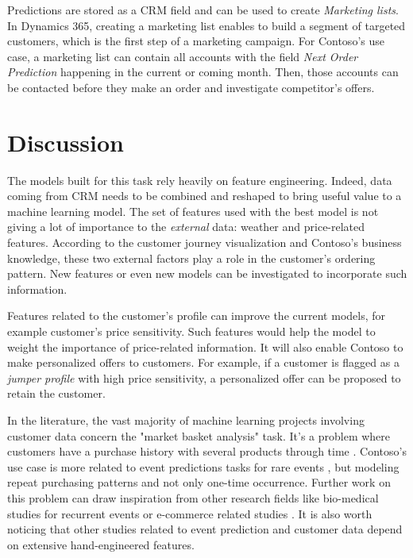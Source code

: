 Predictions are stored as a CRM field and can be used to create \textit{Marketing lists}. In Dynamics 365, creating a marketing list enables to build a segment of targeted customers, which is the first step of a marketing campaign. For Contoso's use case, a marketing list can contain all accounts with the field \textit{Next Order Prediction} happening in the current or coming month. Then, those accounts can be contacted before they make an order and investigate competitor's offers.


\section{Discussion} \label{sec:use-case-further-work}
The models built for this task rely heavily on feature engineering. Indeed, data coming from CRM needs to be combined and reshaped to bring useful value to a machine learning model. The set of features used with the best model is not giving a lot of importance to the \textit{external} data: weather and price-related features. According to the customer journey visualization and Contoso's business knowledge, these two external factors play a role in the customer's ordering pattern. New features or even new models can be investigated to incorporate such information.

Features related to the customer's profile can improve the current models, for example customer's price sensitivity. Such features would help the model to weight the importance of price-related information. It will also enable Contoso to make personalized offers to customers. For example, if a customer is flagged as a \textit{jumper profile} with high price sensitivity, a personalized offer can be proposed to retain the customer.

In the literature, the vast majority of machine learning projects involving customer data concern the "market basket analysis" task. It's a problem where customers have a purchase history with several products through time \cite{temporal-feature}. Contoso's use case is more related to event predictions tasks for rare events \cite{7953302, Malhotra2015LongST}, but modeling repeat purchasing patterns and not only one-time occurrence. Further work on this problem can draw inspiration from other research fields like bio-medical studies for recurrent events \cite{biomedical-recurrent-events} or e-commerce related studies \cite{Liu:2016-repeat-buyer, Tian2015}. It is also worth noticing that other studies related to event prediction and customer data depend on extensive hand-engineered features.

